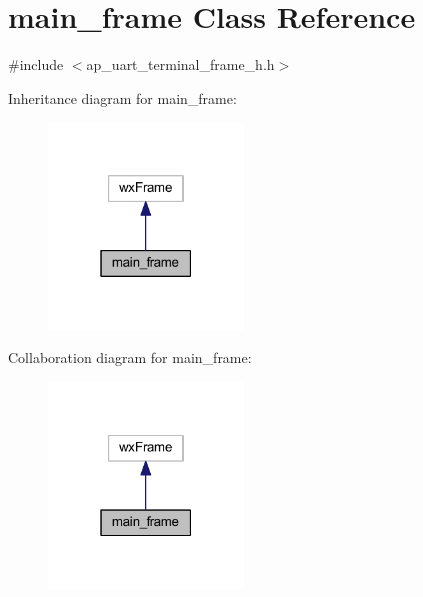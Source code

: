 \section{main\+\_\+frame Class Reference}
\label{classmain__frame}


{\ttfamily \#include $<$ap\+\_\+uart\+\_\+terminal\+\_\+frame\+\_\+h.\+h$>$}



Inheritance diagram for main\+\_\+frame\+:
\nopagebreak
\begin{figure}[H]
\begin{center}
\leavevmode
\includegraphics[width=147pt]{classmain__frame__inherit__graph}
\end{center}
\end{figure}


Collaboration diagram for main\+\_\+frame\+:
\nopagebreak
\begin{figure}[H]
\begin{center}
\leavevmode
\includegraphics[width=147pt]{classmain__frame__coll__graph}
\end{center}
\end{figure}
